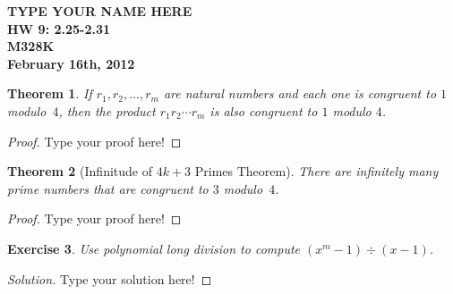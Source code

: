 \documentclass[12pt,leqno]{article}
\numberwithin{equation}{section}
\newtheorem{thm}{Theorem}[section]
\newtheorem{exer}[thm]{Exercise}
\theoremstyle{definition}
\begin{document}
\thispagestyle{plain}
\begin{flushright}
\large{\textbf{TYPE YOUR NAME HERE \\
HW 9: 2.25-2.31\\
M328K \\
February 16th, 2012 \\}}
\end{flushright}

\markboth{}{} \setcounter{section}{0} \baselineskip=18pt

\setcounter{tocdepth}{4}



\setcounter{section}{2}

\setcounter{thm}{36}


\begin{thm}
If $r_1, r_2, \hdots, r_m$ are natural numbers and each one is
congruent to $1$ modulo~$4$, then the product $r_1r_2 \cdots r_m$ is
also congruent to $1$ modulo $4$.
\end{thm}

\begin{proof}[Proof]
Type your proof here!
\end{proof}



\begin{thm}[Infinitude of $4k + 3$ Primes Theorem]
There are infinitely many prime numbers that are congruent to $3$
modulo~$4$.
\end{thm}

\begin{proof}[Proof]
Type your proof here!
\end{proof}


\setcounter{thm}{40}


\begin{exer}
Use  polynomial long division to compute $(x^m-1) \div (x-1)$.
\end{exer}

\begin{proof}[Solution]
Type your solution here!
\end{proof}
\end{document}
